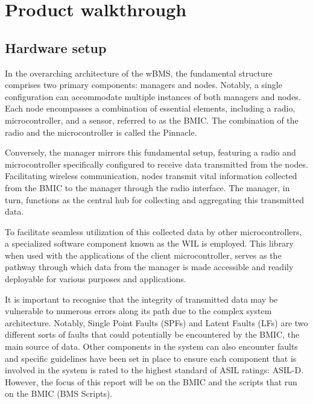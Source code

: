 \chapter{Product walkthrough} %

\label{ch:walkthrough}


\section{Hardware setup}

In the overarching architecture of the wBMS, the fundamental structure comprises two primary components: managers and nodes. Notably, a single configuration can accommodate multiple instances of both managers and nodes. Each node encompasses a combination of essential elements, including a radio, microcontroller, and a sensor, referred to as the BMIC. The combination of the radio and the microcontroller is called the Pinnacle.

Conversely, the manager mirrors this fundamental setup, featuring a radio and microcontroller specifically configured to receive data transmitted from the nodes. Facilitating wireless communication, nodes transmit vital information collected from the BMIC to the manager through the radio interface. The manager, in turn, functions as the central hub for collecting and aggregating this transmitted data.

To facilitate seamless utilization of this collected data by other microcontrollers, a specialized software component known as the WIL is employed. This library when used with the applications of the client microcontroller, serves as the pathway through which data from the manager is made accessible and readily deployable for various purposes and applications.

It is important to recognise that the integrity of transmitted data may be vulnerable to numerous errors along its path due to the complex system architecture. Notably, Single Point Faults (SPFs) and Latent Faults (LFs) are two different sorts of faults that could potentially be encountered by the BMIC, the main source of data. Other components in the system can also encounter faults and specific guidelines have been set in place to ensure each component that is involved in the system is rated to the highest standard of ASIL ratings: ASIL-D. However, the focus of this report will be on the BMIC and the scripts that run on the BMIC (BMS Scripts).

